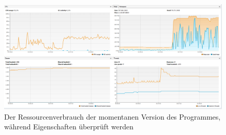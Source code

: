\documentclass[a4paper]{scrreprt}
\begin{document}
\begin{figure}[ht]
	\centering
  \includegraphics[width=1.0\textheight, 
  height=1.0\textwidth, angle=90]{images/NEW_YES.png} \caption{Der Ressourcenverbrauch der
  momentanen Version des Programmes, während Eigenschaften überprüft werden}
	\label{a}
\end{figure}
\end{document}
